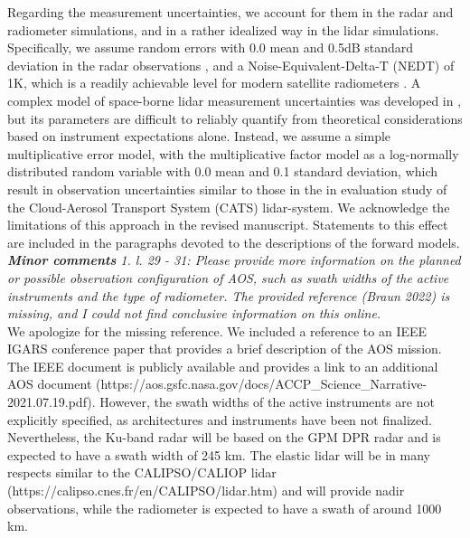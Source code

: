 \documentclass[12pt]{article}
\begin{document}
\newline
Regarding the measurement uncertainties, we account for them in the radar and radiometer simulations,
and in a rather idealized way in the lidar simulations.  Specifically, we assume random errors with 0.0 mean
and 0.5dB standard deviation in the radar observations \cite{takahashi2008}, and a Noise-Equivalent-Delta-T (NEDT)
of 1K, which is a readily achievable level for modern satellite radiometers \cite{draper2015}.
A complex model of space-borne lidar measurement uncertainties was developed in \cite{liu2006}, but its parameters are
difficult to reliably quantify from theoretical considerations based on instrument expectations alone. Instead, we
assume a simple multiplicative error model, with the multiplicative factor model as a log-normally distributed random
variable with 0.0 mean and 0.1 standard deviation, which result in observation uncertainties similar to those in
the in evaluation study of the Cloud-Aerosol Transport System (CATS) lidar-system. 
We acknowledge the limitations of this approach in the revised manuscript.  Statements to this effect are included in
the paragraphs devoted to the descriptions of the forward models. \\ 
\newline
\textit{\textbf{Minor comments}
    1. l. 29 - 31: Please provide more information on the planned or possible observation configuration of AOS, such as swath
     widths of the active instruments and the type of radiometer. The provided reference (Braun 2022) is missing, and I 
     could not find conclusive information on this online.}\\
\newline
We apologize for the missing reference.  We included a reference to an IEEE IGARS conference paper \cite{braun2022} that provides a brief description of the AOS mission.
The IEEE document is publicly available and provides a link to an additional AOS document (https://aos.gsfc.nasa.gov/docs/ACCP\_Science\_Narrative-2021.07.19.pdf). 
However, the swath widths of the active instruments are not explicitly specified, as architectures and instruments have been not finalized.  Nevertheless,
the Ku-band radar will be based on the GPM DPR radar and is expected to have a swath width of 245 km.  The elastic lidar will be in many respects 
similar to the CALIPSO/CALIOP lidar (https://calipso.cnes.fr/en/CALIPSO/lidar.htm) and will provide nadir observations,  while the radiometer is expected 
to have a swath of around 1000 km.\\
\newline
\end{document}

